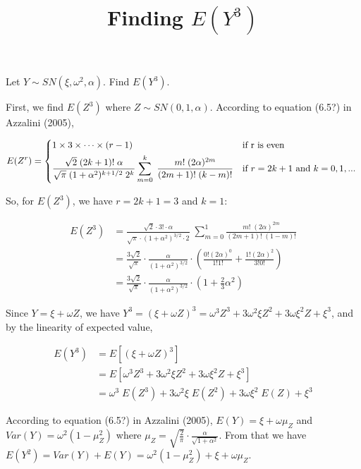 \documentclass{article}
\begin{document}
\title {Finding $E(Y^3)$}
\date{}
\maketitle

Let $Y \sim SN(\xi, \omega^2, \alpha)$. Find $E(Y^3)$.

First, we find $E(Z^3)$ where $Z \sim SN(0, 1, \alpha)$. According to equation (6.5?) in Azzalini (2005),

\[
E(Z^r) =
 \begin{dcases*}
   1 \times 3 \times \cdots \times (r -1) & if r is even \\
   \frac{\sqrt{2}\;(2k + 1)!\;\alpha}{\sqrt{\pi}\;(1 + \alpha^2)^{k + 1/2}\;2^k}
   \sum_{m=0}^k\;\frac{m!\;(2\alpha)^{2m}}{(2m+1)!\;(k-m)!} & if $r = 2k+1$ and $k = 0, 1, ...$
\end{dcases*}
\]

So, for $E(Z^3)$, we have $r = 2k + 1 = 3$ and $k = 1$:

\begin{align*}
  E(Z^3) &= \frac{\sqrt{2} \cdot 3! \cdot \alpha}{\sqrt{\pi} \cdot (1 + \alpha^2)^{3/2} \cdot 2} \;
  \sum_{m=0}^1 \frac{m!\;(2\alpha)^{2m}}{(2m + 1)!\;(1 - m)!} \\
  &= \frac{3\sqrt{2}}{\sqrt{\pi}} \cdot \frac{\alpha}{(1 + \alpha^2)^{3/2}} \cdot \left( \frac{0!
      (2\alpha)^0}{1!1!} + \frac{1! (2\alpha)^2}{3!0!} \right) \\
  &= \frac{3\sqrt{2}}{\sqrt{\pi}} \cdot \frac{\alpha}{(1 + \alpha^2)^{3/2}} \cdot \left( 1 +
    \frac{2}{3}\alpha^2 \right)
\end{align*}

Since $Y = \xi + \omega Z$, we have $Y^3 = (\xi + \omega Z)^3 = \omega^3 Z^3 + 3 \omega^2 \xi Z^2 +
3 \omega \xi^2 Z + \xi^3$, and by the linearity of expected value,

\begin{align*}
  E(Y^3) &= E [(\xi + \omega Z)^3] \\
  &= E[\omega^3 Z^3 + 3 \omega^2 \xi Z^2 + 3 \omega \xi^2 Z + \xi^3] \\
  &= \omega^3\;E(Z^3) + 3 \omega^2 \xi\;E(Z^2) + 3 \omega \xi^2\;E(Z) + \xi^3
\end{align*}

According to equation (6.5?) in Azzalini (2005), $E(Y) = \xi + \omega \mu_Z$ and $Var(Y) = \omega^2
(1 - \mu_Z^2)$ where $\mu_Z = \sqrt{\frac{2}{\pi}} \cdot \frac{\alpha}{\sqrt{1 + \alpha^2}}$. From
that we have $E(Y^2) = Var(Y) + E(Y) = \omega^2 (1 - \mu_Z^2) + \xi + \omega \mu_Z$.
\end{document}
